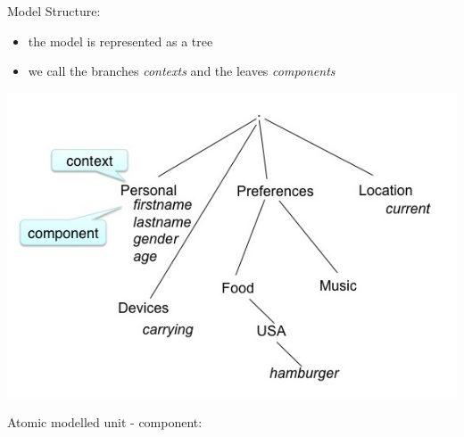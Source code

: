 \documentclass[a4paper,10pt,english]{sphinxmanual}
\begin{document}
Model Structure:
\begin{itemize}
\item {} 
the model is represented as a tree

\item {} 
we call the branches \emph{contexts} and the leaves \emph{components}

\end{itemize}

\includegraphics{model-tree.jpg}

Atomic modelled unit - component:
\end{document}
